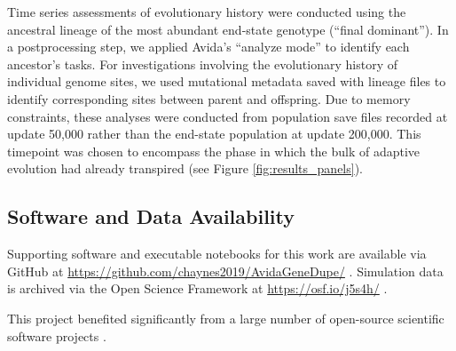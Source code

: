 Time series assessments of evolutionary history were conducted using the ancestral lineage of the most abundant end-state genotype (``final dominant'').
In a postprocessing step, we applied Avida's ``analyze mode'' to identify each ancestor's tasks.
For investigations involving the evolutionary history of individual genome sites, we used mutational metadata saved with lineage files to identify corresponding sites between parent and offspring.
Due to memory constraints, these analyses were conducted from population save files recorded at update 50,000 rather than the end-state population at update 200,000.
This timepoint was chosen to encompass the phase in which the bulk of adaptive evolution had already transpired (see Figure \ref{fig:results_panels}).

\subsection{Software and Data Availability} \label{sec:materials}

Supporting software and executable notebooks for this work are available via GitHub at \url{https://github.com/chaynes2019/AvidaGeneDupe/} \citep{david_m_bryson_2025_14911296}.
Simulation data is archived via the Open Science Framework at \url{https://osf.io/j5s4h/} \citep{foster2017open}.

This project benefited significantly from a large number of open-source scientific software projects \citep{2020SciPy-NMeth,harris2020array,reback2020pandas,mckinney-proc-scipy-2010,waskom2021seaborn,hunter2007matplotlib,moreno2023teeplot,r_core_team_r:_2015}.
